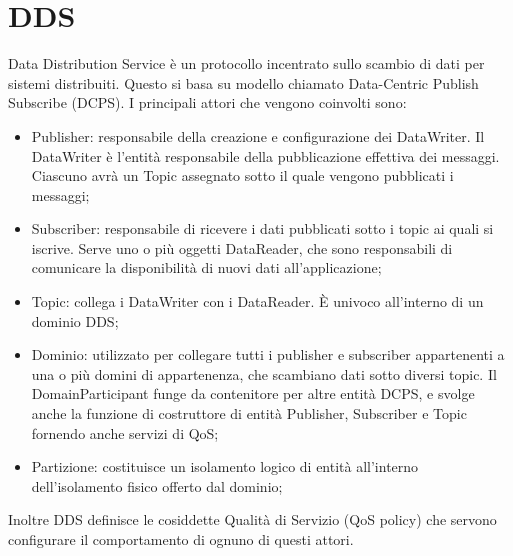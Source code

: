 \section{DDS}
Data Distribution Service è un protocollo incentrato sullo scambio di dati per sistemi distribuiti. Questo si basa su modello chiamato Data-Centric Publish Subscribe (DCPS). I principali attori che vengono coinvolti sono:
\begin{itemize}
    \item Publisher: responsabile della creazione e configurazione dei DataWriter. Il DataWriter è l'entità responsabile della pubblicazione effettiva dei messaggi. Ciascuno avrà un Topic assegnato sotto il quale vengono pubblicati i messaggi;\label{actor:publisher}

    \item Subscriber: responsabile di ricevere i dati pubblicati sotto i topic ai quali si iscrive. Serve uno o più oggetti DataReader, che sono responsabili di comunicare la disponibilità di nuovi dati all'applicazione;\label{actor:subscriber}

    \item Topic: collega i DataWriter con i DataReader. È univoco all'interno di un dominio DDS;\@
    
    \item Dominio: utilizzato per collegare tutti i publisher e subscriber appartenenti a una o più domini di appartenenza, che scambiano dati sotto diversi topic. Il DomainParticipant funge da contenitore per altre entità DCPS, e svolge anche la funzione di costruttore di entità Publisher, Subscriber e Topic fornendo anche servizi di QoS;\@

    \item Partizione: costituisce un isolamento logico di entità all'interno dell'isolamento fisico offerto dal dominio;

\end{itemize}
Inoltre DDS definisce le cosiddette Qualità di Servizio (QoS policy) che servono configurare il comportamento di ognuno di questi attori.


